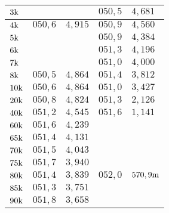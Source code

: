 \begin{table}[H]
\begin{tabular}{l||l|l||l|l|}
\multicolumn{1}{|l||}{$3\text{k}$}                       &$              $&$             $&$ 050,5    $&$ 4,681        $\\ \hline
\multicolumn{1}{|l||}{$4\text{k}$}                       &$ 050,6     $&$ 4,915       $&$ 050,9    $&$ 4,560        $\\ \hline
\multicolumn{1}{|l||}{$5\text{k}$}                       &$              $&$             $&$ 050,9    $&$ 4,384        $\\ \hline
\multicolumn{1}{|l||}{$6\text{k}$}                       &$              $&$             $&$ 051,3    $&$ 4,196        $\\ \hline
\multicolumn{1}{|l||}{$7\text{k}$}                       &$              $&$             $&$ 051,0    $&$ 4,000        $\\ \hline
\multicolumn{1}{|l||}{$8\text{k}$}                       &$ 050,5     $&$ 4,864       $&$ 051,4    $&$ 3,812        $\\ \hline
\multicolumn{1}{|l||}{$10\text{k}$}                      &$ 050,6     $&$ 4,864       $&$ 051,0    $&$ 3,427        $\\ \hline
\multicolumn{1}{|l||}{$20\text{k}$}                      &$ 050,8     $&$ 4,824       $&$ 051,3    $&$ 2,126        $\\ \hline
\multicolumn{1}{|l||}{$40\text{k}$}                      &$ 051,2     $&$ 4,545       $&$ 051,6    $&$ 1,141        $\\ \hline
\multicolumn{1}{|l||}{$60\text{k}$}                      &$ 051,6     $&$ 4,239       $&$             $&$              $\\ \hline
\multicolumn{1}{|l||}{$65\text{k}$}                      &$ 051,4     $&$ 4,131       $&$             $&$              $\\ \hline
\multicolumn{1}{|l||}{$70\text{k}$}                      &$ 051,5     $&$ 4,043       $&$             $&$              $\\ \hline
\multicolumn{1}{|l||}{$75\text{k}$}                      &$ 051,7     $&$ 3,940       $&$             $&$              $\\ \hline
\multicolumn{1}{|l||}{$80\text{k}$}                      &$ 051,4     $&$ 3,839       $&$ 052,0    $&$ 570,9\text{m}     $\\ \hline
\multicolumn{1}{|l||}{$85\text{k}$}                      &$ 051,3     $&$ 3,751       $&$             $&$              $\\ \hline
\multicolumn{1}{|l||}{$90\text{k}$}                      &$ 051,8     $&$ 3,658       $&$             $&$              $\\ \hline

\end{tabular}
\end{table}
